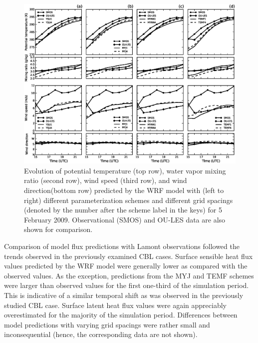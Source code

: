 \begin{figure}[ht!]
\begin{center}
\includegraphics[width=\textwidth]{figures/chapter4/meteogram_grid_20090205}
\end{center}
\caption{Evolution of potential temperature (top row), water vapor mixing ratio (second row), wind speed (third row), and wind direction(bottom row) predicted by the WRF model with (left to right) different parameterization schemes and different grid spacings (denoted by the number after the scheme label in the keys) for 5 February 2009. Observational (SMOS) and OU-LES data are also shown for comparison.}
\label{figure428}
\end{figure}


Comparison of model flux predictions with Lamont observations followed the trends observed in the previously examined CBL cases. Surface sensible heat flux values predicted by the WRF model were generally lower as compared with the observed values. As the exception, predictions from the MYJ and TEMF schemes were larger than observed values for the first one-third of the simulation period. This is indicative of a similar temporal shift as was observed in the previously studied CBL case. Surface latent heat flux values were again appreciably overestimated for the majority of the simulation period. Differences between model predictions with varying grid spacings were rather small and inconsequential (hence, the corresponding data are not shown). 

